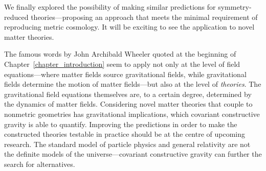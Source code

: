 We finally explored the possibility of making similar predictions for symmetry-reduced theories---proposing an approach that meets the minimal requirement of reproducing metric cosmology. It will be exciting to see the application to novel matter theories.

The famous words by John Archibald Wheeler quoted at the beginning of Chapter~\ref{chapter_introduction} seem to apply not only at the level of field equations---where matter fields source gravitational fields, while gravitational fields determine the motion of matter fields---but also at the level of \emph{theories}. The gravitational field equations themselves are, to a certain degree, determined by the dynamics of matter fields. Considering novel matter theories that couple to nonmetric geometries has gravitational implications, which covariant constructive gravity is able to quantify. Improving the predictions in order to make the constructed theories testable in practice should be at the centre of upcoming research. The standard model of particle physics and general relativity are not the definite models of the universe---covariant constructive gravity can further the search for alternatives.
